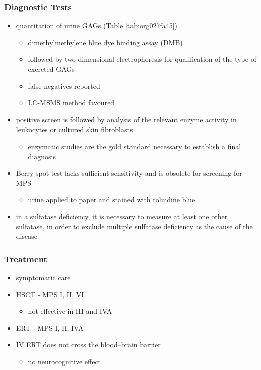 \documentclass[12pt]{scrartcl}
\begin{document}
\subsubsection{Diagnostic Tests}
\label{sec:orga0a5dd1}
\begin{itemize}
\item quantitation of urine GAGs (Table \ref{tab:org027fa45})
\begin{itemize}
\item dimethylmethylene blue dye binding assay (DMB)
\item followed by two-dimensional electrophoresis for qualification of
the type of excreted GAGs
\item false negatives reported
\item LC-MSMS method favoured
\end{itemize}
\item positive screen is followed by analysis of the relevant enzyme
activity in leukocytes or cultured skin fibroblasts
\begin{itemize}
\item enzymatic studies are the gold standard necessary to establish a
final diagnosis
\end{itemize}
\item Berry spot test lacks sufficient sensitivity and is obsolete for
screening for MPS
\begin{itemize}
\item urine applied to paper and stained with toluidine blue
\end{itemize}
\item in a sulfatase deficiency, it is necessary to measure at least one
other sulfatase, in order to exclude multiple sulfatase deficiency
as the cause of the disease
\end{itemize}

\subsubsection{Treatment}
\label{sec:orgaf78c6c}
\begin{itemize}
\item symptomatic care
\item HSCT - MPS I, II, VI
\begin{itemize}
\item not effective in III and IVA
\end{itemize}
\item ERT - MPS I, II, IVA
\item IV ERT does not cross the blood–brain barrier
\begin{itemize}
\item no neurocognitive effect
\end{itemize}
\end{itemize}
\end{document}
